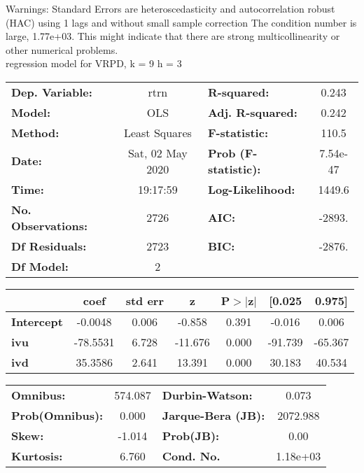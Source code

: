 Warnings: \newline
 [1] Standard Errors are heteroscedasticity and autocorrelation robust (HAC) using 1 lags and without small sample correction \newline
 [2] The condition number is large, 1.77e+03. This might indicate that there are \newline
 strong multicollinearity or other numerical problems.\\ 

regression model for VRPD, k = 9 h = 3\begin{center}
\begin{tabular}{lclc}
\toprule
\textbf{Dep. Variable:}    &       rtrn       & \textbf{  R-squared:         } &     0.243   \\
\textbf{Model:}            &       OLS        & \textbf{  Adj. R-squared:    } &     0.242   \\
\textbf{Method:}           &  Least Squares   & \textbf{  F-statistic:       } &     110.5   \\
\textbf{Date:}             & Sat, 02 May 2020 & \textbf{  Prob (F-statistic):} &  7.54e-47   \\
\textbf{Time:}             &     19:17:59     & \textbf{  Log-Likelihood:    } &    1449.6   \\
\textbf{No. Observations:} &        2726      & \textbf{  AIC:               } &    -2893.   \\
\textbf{Df Residuals:}     &        2723      & \textbf{  BIC:               } &    -2876.   \\
\textbf{Df Model:}         &           2      & \textbf{                     } &             \\
\bottomrule
\end{tabular}
\begin{tabular}{lcccccc}
                   & \textbf{coef} & \textbf{std err} & \textbf{z} & \textbf{P$> |$z$|$} & \textbf{[0.025} & \textbf{0.975]}  \\
\midrule
\textbf{Intercept} &      -0.0048  &        0.006     &    -0.858  &         0.391        &       -0.016    &        0.006     \\
\textbf{ivu}       &     -78.5531  &        6.728     &   -11.676  &         0.000        &      -91.739    &      -65.367     \\
\textbf{ivd}       &      35.3586  &        2.641     &    13.391  &         0.000        &       30.183    &       40.534     \\
\bottomrule
\end{tabular}
\begin{tabular}{lclc}
\textbf{Omnibus:}       & 574.087 & \textbf{  Durbin-Watson:     } &    0.073  \\
\textbf{Prob(Omnibus):} &   0.000 & \textbf{  Jarque-Bera (JB):  } & 2072.988  \\
\textbf{Skew:}          &  -1.014 & \textbf{  Prob(JB):          } &     0.00  \\
\textbf{Kurtosis:}      &   6.760 & \textbf{  Cond. No.          } & 1.18e+03  \\
\bottomrule
\end{tabular}
\end{center}

